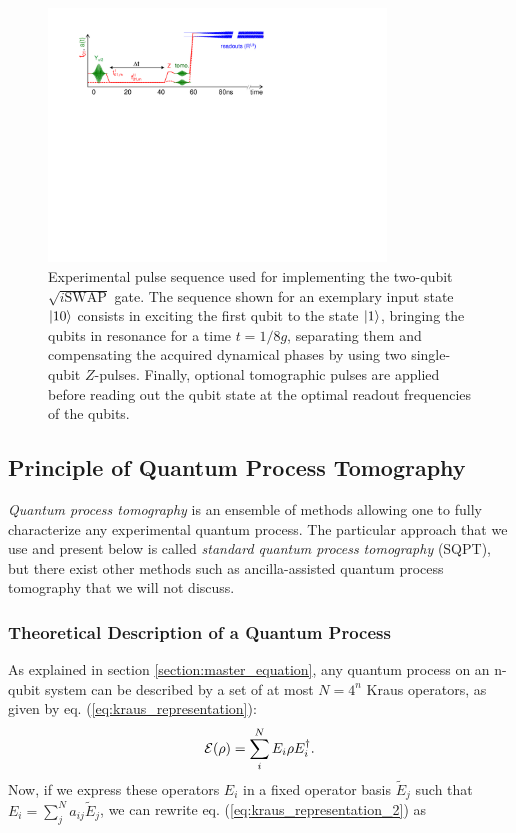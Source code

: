 \begin{figure}[hb!]
	\centering
		\includegraphics[width=0.8\textwidth]{./material/figures/measurement/qubit_iswap_full}
	\caption{Experimental pulse sequence used for implementing the two-qubit $\sqrt{i\mathrm{SWAP}}$ gate. The sequence shown for an exemplary input state $\left| 10 \right>$ consists in exciting the first qubit to the state $\left| 1 \right>$, bringing the qubits in resonance for a time $t=1/8g$, separating them and compensating the acquired dynamical phases by using two single-qubit $Z$-pulses. Finally, optional tomographic pulses are applied before reading out the qubit state at the optimal readout frequencies of the qubits.}
	\label{fig:iswap_pulse_sequence}
\end{figure}

\subsection{Principle of Quantum Process Tomography}

{\it Quantum process tomography} \citep{poyatos_complete_1997} is an ensemble of methods allowing  one to fully characterize any experimental quantum process. The particular approach that we use and present below is called {\it standard quantum process tomography} (SQPT), but there exist other methods such as ancilla-assisted quantum process tomography \citep{dur_nonlocal_2001,dariano_quantum_2001,altepeter_ancilla-assisted_2003} that we will not discuss.

\subsubsection{Theoretical Description of a Quantum Process}

As explained in section \ref{section:master_equation}, any quantum process on an n-qubit system can be described by a set of at most $N=4^n$ Kraus operators, as given by eq. (\ref{eq:kraus_representation}):
%
\begin{equation}
\begin{mathcal}E\end{mathcal}(\rho) = \sum\limits_i^{N} E_i \rho E_i^\dagger \label{eq:kraus_representation_2}.
\end{equation}
%
Now, if we express these operators $E_i$ in a fixed operator basis $\tilde{E}_j$ such that $E_i = \sum_j^N a_{ij} \tilde{E}_{j}$, we can rewrite eq. (\ref{eq:kraus_representation_2}) as

